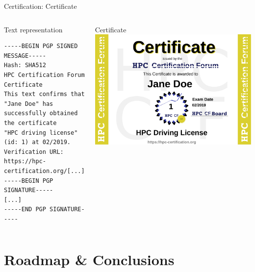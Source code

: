\documentclass[compress,aspectratio=169]{beamer}
\begin{document}
\begin{frame}[fragile]{Certification: Certificate}
\begin{columns}
	\begin{block}{Text representation}

		\scriptsize
		\begin{verbatim}
-----BEGIN PGP SIGNED MESSAGE-----
Hash: SHA512
HPC Certification Forum Certificate
This text confirms that "Jane Doe" has
successfully obtained the certificate
"HPC driving license" (id: 1) at 02/2019.
Verification URL: https://hpc-certification.org/[...]
-----BEGIN PGP SIGNATURE-----
[...]
-----END PGP SIGNATURE-----
		\end{verbatim}
	\end{block}

	\begin{block}{Certificate}
		\medskip
		\includegraphics[width=\textwidth]{jane-doe}
	\end{block}
\end{columns}
\end{frame}



\section{Roadmap \& Conclusions}
\sectionIntroHidden
\end{document}
